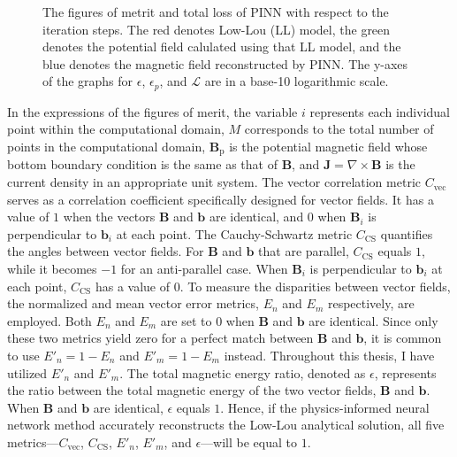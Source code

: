 \begin{figure}[!]
  \caption{The figures of metrit and total loss of PINN with respect to the iteration steps. The red denotes Low-Lou (LL) model, the green denotes the potential field calulated using that LL model, and the blue denotes the magnetic field reconstructed by PINN. The y-axes of the graphs for $\epsilon$, $\epsilon_p$, and $\mathcal{L}$ are in a base-10 logarithmic scale.}\label{fig:metric}
\end{figure}

In the expressions of the figures of merit, the variable $i$ represents each individual point within the computational domain, $M$ corresponds to the total number of points in the computational domain, $\mathbf{B}_{\text{p}}$ is the potential magnetic field whose bottom boundary condition is the same as that of $\mathbf{B}$, and $\mathbf{J} = \nabla \times \mathbf{B}$ is the current density in an appropriate unit system. The vector correlation metric $C_\text{vec}$ serves as a correlation coefficient specifically designed for vector fields. It has a value of $1$ when the vectors $\mathbf{B}$ and $\mathbf{b}$ are identical, and $0$ when $\mathbf{B}_i$ is perpendicular to $\mathbf{b}_i$ at each point. The Cauchy-Schwartz metric $C_\text{CS}$ quantifies the angles between vector fields. For $\mathbf{B}$ and $\mathbf{b}$ that are parallel, $C_\text{CS}$ equals $1$, while it becomes $-1$ for an anti-parallel case. When $\mathbf{B}_i$ is perpendicular to $\mathbf{b}_i$ at each point, $C_\text{CS}$ has a value of $0$. To measure the disparities between vector fields, the normalized and mean vector error metrics, $E_n$ and $E_m$ respectively, are employed. Both $E_n$ and $E_m$ are set to $0$ when $\mathbf{B}$ and $\mathbf{b}$ are identical. Since only these two metrics yield zero for a perfect match between $\mathbf{B}$ and $\mathbf{b}$, it is common to use $E'_n=1-E_n$ and $E'_m=1-E_m$ instead. Throughout this thesis, I have utilized $E'_n$ and $E'_m$. The total magnetic energy ratio, denoted as $\epsilon$, represents the ratio between the total magnetic energy of the two vector fields, $\mathbf{B}$ and $\mathbf{b}$. When $\mathbf{B}$ and $\mathbf{b}$ are identical, $\epsilon$ equals $1$.  Hence, if the physics-informed neural network method accurately reconstructs the Low-Lou analytical solution, all five metrics—$C_\text{vec}$, $C_\text{CS}$, $E'_n$, $E'_m$, and $\epsilon$—will be equal to $1$.

